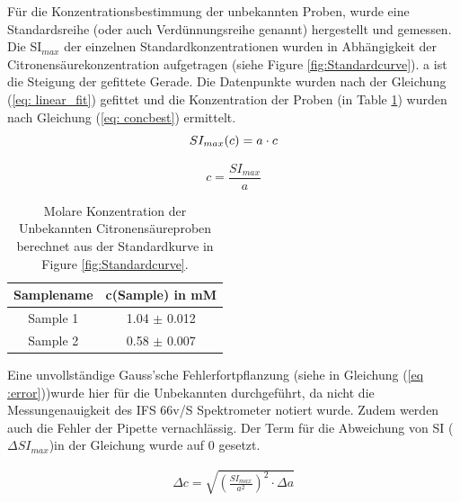 \documentclass[10pt,a4paper]{article}
\begin{document}
			Für die Konzentrationsbestimmung der unbekannten Proben, wurde eine Standardsreihe (oder auch Verdünnungsreihe genannt) hergestellt und gemessen.\\
			Die SI$_{max}$  der einzelnen Standardkonzentrationen wurden in Abhängigkeit der Citronensäurekonzentration aufgetragen (siehe Figure \ref{fig:Standardcurve}). a ist die Steigung der gefittete Gerade. Die Datenpunkte wurden nach der Gleichung (\ref{eq: linear_fit}) gefittet und die Konzentration der Proben (in Table \ref{tab:sampleconc}) wurden nach Gleichung (\ref{eq: concbest}) ermittelt.\\

			\begin{equation}\label{eq: linear_fit}
				SI_{max} (c)= a \cdot c\\
			\end{equation}
			
			\begin{equation}\label{eq: concbest}
				c = \frac{SI_{max}}{a}
			\end{equation}
			
			\begin{table}[H]
				\centering
				\caption{Molare Konzentration der Unbekannten Citronensäureproben berechnet aus der Standardkurve in Figure \ref{fig:Standardcurve}.}
				\label{tab:sampleconc}
				\begin{tabular}{cc}
					\toprule
					Samplename & c(Sample) in mM\\
					\midrule
					Sample 1 & 1.04 $\pm$ 0.012\\
					Sample 2 & 0.58 $\pm$ 0.007\\
					\bottomrule
				\end{tabular}
			\end{table}	

			Eine unvollständige Gauss'sche Fehlerfortpflanzung (siehe in Gleichung (\ref{eq :error}))wurde hier für die Unbekannten durchgeführt, da nicht die Messungenauigkeit des IFS 66v/S Spektrometer notiert wurde. Zudem werden auch die Fehler der Pipette vernachlässig. Der Term für die Abweichung von SI ($\Delta SI_{max}$)in der Gleichung wurde auf 0 gesetzt.
			
			\begin{equation}\label{eq :error}
				\begin{split}
					\Delta c = \sqrt{\left( \frac{SI_{max}}{a^2}\right)^2 \cdot \Delta a}
				\end{split}
			\end{equation}
			
\end{document}
